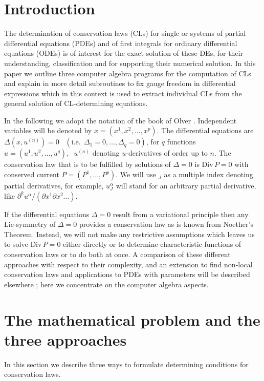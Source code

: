 \section{Introduction}
The determination of conservation laws (CLs) for single or systems of 
partial differential equations (PDEs) and of first integrals for ordinary 
differential equations (ODEs) is of interest for the exact solution 
of these DEs, for their understanding, classification and for supporting 
their numerical solution. In this paper we outline three computer
algebra programs for the computation of CLs and explain
in more detail subroutines to fix gauge freedom in differential
expressions which in this context is used to extract individual CLs
from the general solution of CL-determining equations.

In the following we adopt the notation of the book of Olver \cite{PO}.
Independent variables will be denoted by $x = (x^1, x^2, \ldots , x^p)$.
The differential equations are $\Delta(x,u^{(n)}) = 0
\;\;\;(\mbox{i.e.}\;\, \Delta_1=0, \ldots , \Delta_q=0)$,
for $q$ functions $u = (u^1, u^2, \ldots , u^q),\;\; u^{(n)}$ denoting
$u$-derivatives of order up to $n.$ The conservation law that is to be
fulfilled by solutions of $\Delta = 0$ is $\mbox{Div}\,P = 0$ with conserved
current $P = (P^1, \ldots , P^p).$ We will use $_J$ as a multiple index
denoting partial derivatives, for example, $u^{\alpha}_{J}$ will stand for
an arbitrary partial derivative, like
$\partial^k u^{\alpha}/(\partial x^1\partial x^2\ldots)$.

If the differential equations $\Delta = 0$ result from a variational
principle then any Lie-symmetry of $\Delta = 0$ provides a conservation
law as is known from Noether's Theorem. Instead, we will not make
any restrictive assumptions which leaves us to solve $\mbox{Div}\,P = 0$
either directly or to determine characteristic functions of conservation
laws or to do both at once. A comparison of these different approaches
with respect to their complexity, and an extension to find non-local
conservation laws and applications to PDEs with parameters will be
described elsewhere \cite{TW}; here we concentrate on the computer 
algebra aspects.

\section{The mathematical problem and the three approaches}
In this section we describe three ways to formulate
determining conditions for conservation laws.

